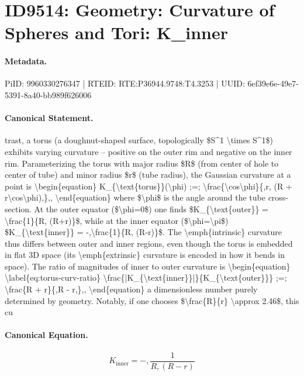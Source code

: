 \section*{ID9514: Geometry: Curvature of Spheres and Tori: K\_inner}
\paragraph{Metadata.}
PiID: 9960330276347 | RTEID: RTE:P36944.9748:T4.3253 | UUID: 6ef39e6e-49e7-5391-8a40-bb989f626006

\paragraph{Canonical Statement.}
trast, a torus (a doughnut-shaped surface, topologically \$S\textasciicircum{}1 \textbackslash{}times S\textasciicircum{}1\$) exhibits varying curvature – positive on the outer rim and negative on the inner rim. Parameterizing the torus with major radius \$R\$ (from center of hole to center of tube) and minor radius \$r\$ (tube radius), the Gaussian curvature at a point is \textbackslash{}begin\{equation\} K\_\{\textbackslash{}text\{torus\}\}(\textbackslash{}phi) ;=; \textbackslash{}frac\{\textbackslash{}cos\textbackslash{}phi\}\{,r, (R + r\textbackslash{}cos\textbackslash{}phi),\},, \textbackslash{}end\{equation\} where \$\textbackslash{}phi\$ is the angle around the tube cross-section. At the outer equator (\$\textbackslash{}phi=0\$) one finds \$K\_\{\textbackslash{}text\{outer\}\} = \textbackslash{}frac\{1\}\{R, (R+r)\}\$, while at the inner equator (\$\textbackslash{}phi=\textbackslash{}pi\$) \$K\_\{\textbackslash{}text\{inner\}\} = -,\textbackslash{}frac\{1\}\{R, (R-r)\}\$. The \textbackslash{}emph\{intrinsic\} curvature thus differs between outer and inner regions, even though the torus is embedded in flat 3D space (its \textbackslash{}emph\{extrinsic\} curvature is encoded in how it bends in space). The ratio of magnitudes of inner to outer curvature is \textbackslash{}begin\{equation\} \textbackslash{}label\{eq:torus-curv-ratio\} \textbackslash{}frac\{|K\_\{\textbackslash{}text\{inner\}\}|\}\{K\_\{\textbackslash{}text\{outer\}\}\} ;=; \textbackslash{}frac\{R + r\}\{,R - r,\},, \textbackslash{}end\{equation\} a dimensionless number purely determined by geometry. Notably, if one chooses \$\textbackslash{}frac\{R\}\{r\} \textbackslash{}approx 2.46\$, this cu

\paragraph{Canonical Equation.}
\[
K_{\text{inner}} = -,\frac{1}{R, (R-r)}
\]

